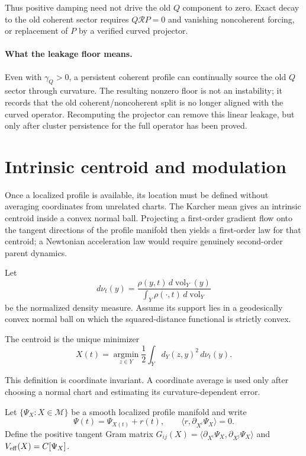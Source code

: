 \documentclass[11pt]{article}
\begin{document}
Thus positive damping need not drive the old $Q$ component to zero. Exact
decay to the old coherent sector requires $Q\mathcal RP=0$ and vanishing
noncoherent forcing, or replacement of $P$ by a verified curved projector.

\paragraph{What the leakage floor means.}
Even with $\gamma_Q>0$, a persistent coherent profile can continually source
the old $Q$ sector through curvature.  The resulting nonzero floor is not an
instability; it records that the old coherent/noncoherent split is no longer
aligned with the curved operator.  Recomputing the projector can remove this
linear leakage, but only after cluster persistence for the full operator has
been proved.

\section{Intrinsic centroid and modulation}

Once a localized profile is available, its location must be defined without
averaging coordinates from unrelated charts.  The Karcher mean gives an
intrinsic centroid inside a convex normal ball.  Projecting a first-order
gradient flow onto the tangent directions of the profile manifold then yields
a first-order law for that centroid; a Newtonian acceleration law would
require genuinely second-order parent dynamics.

Let
\[
d\nu_t(y)=\frac{\rho(y,t)\,d\operatorname{vol}_Y(y)}
{\int_Y\rho(\cdot,t)\,d\operatorname{vol}_Y}
\]
be the normalized density measure. Assume its support lies in a geodesically
convex normal ball on which the squared-distance functional is strictly
convex.

\begin{definition}
The centroid is the unique minimizer
\[
X(t)=\operatorname*{argmin}_{z\in Y}
\frac12\int_Y d_Y(z,y)^2\,d\nu_t(y).
\]
\end{definition}

This definition is coordinate invariant. A coordinate average is used only
after choosing a normal chart and estimating its curvature-dependent error.

Let $\{\Psi_X:X\in\mathcal M\}$ be a smooth localized profile manifold and
write
\[
\Psi(t)=\Psi_{X(t)}+r(t),
\qquad
\langle r,\partial_{X^i}\Psi_X\rangle=0.
\]
Define the positive tangent Gram matrix
$G_{ij}(X)=\langle\partial_{X^i}\Psi_X,
\partial_{X^j}\Psi_X\rangle$ and
$V_{\rm eff}(X)=C[\Psi_X]$.
\end{document}
